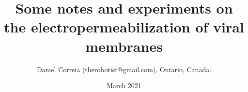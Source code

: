 \documentclass[paper.tex]{subfiles}
\begin{document}




\title{Some notes and experiments on the electropermeabilization of viral membranes}
\author{\small{ Daniel Correia (therobotist@gmail.com), Ontario, Canada.}}
\date{March 2021}


\flushbottom 
\maketitle
\thispagestyle{empty}

\renewcommand{\abstractname}{Summary}    %
\end{document}
